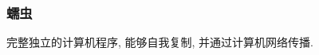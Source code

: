 \documentclass{ctexart}
\begin{document}
\subsubsection{蠕虫}
    完整独立的计算机程序, 能够自我复制, 并通过计算机网络传播.

%
%
\end{document}
